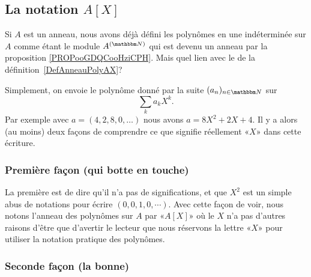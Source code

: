 \subsection{La notation \texorpdfstring{$ A[X]$}{A[X]}}
\label{SUBSECooLEKVooFBPSJz}

Si \( A\) est un anneau, nous avons déjà défini les polynômes en une indéterminée sur \( A\) comme étant le module \( A^{(\eN)}\) qui est devenu un anneau par la proposition \ref{PROPooGDQCooHziCPH}. Mais quel lien avec le de la définition~\ref{DefAnneauPolyAX}?

Simplement, on envoie le polynôme donné par la suite \( (a_n)_{n\in \eN}\) sur 
\begin{equation}
    \sum_ka_kX^k.
\end{equation}
Par exemple avec \( a=(4,2,8,0, \dots)\) nous avons \( a=8X^2+2X+4\). Il y a alors (au moins) deux façons de comprendre ce que signifie réellement «\( X\)» dans cette écriture.

\subsubsection{Première façon (qui botte en touche)}

La première est de dire qu'il n'a pas de significations, et que \( X^2\) est un simple abus de notations pour écrire \( (0,0,1,0,\cdots)\). Avec cette façon de voir, nous notons l'anneau des polynômes sur \( A\) par «\( A[X]\)» où le \( X\) n'a pas d'autres raisons d'être que d'avertir le lecteur que nous réservons la lettre «\( X\)» pour utiliser la notation pratique des polynômes.

\subsubsection{Seconde façon (la bonne)}
\label{SUBSUBSECooPNBYooWXEHrg}

